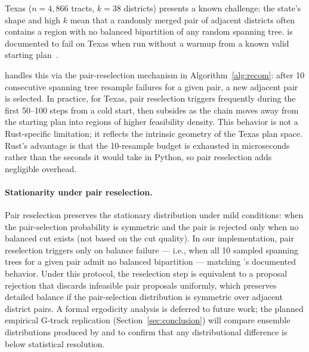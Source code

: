 Texas ($n = 4{,}866$ tracts, $k = 38$ districts) presents a known
challenge: the state's shape and high $k$ mean that a randomly merged
pair of adjacent districts often contains a region with no balanced
bipartition of any random spanning tree.
\gc{} is documented to fail on Texas when run without a warmup from a
known valid starting plan~\citep{gerrychain2021}.

\re{} handles this via the pair-reselection mechanism in
Algorithm~\ref{alg:recom}: after 10 consecutive spanning tree resample
failures for a given pair, a new adjacent pair is selected.
In practice, for Texas, pair reselection triggers frequently during the
first 50--100 steps from a cold start, then subsides as the chain moves
away from the starting plan into regions of higher feasibility density.
This behavior is not a Rust-specific limitation; it reflects the intrinsic
geometry of the Texas plan space.
Rust's advantage is that the 10-resample budget is exhausted in
microseconds rather than the seconds it would take in Python, so pair
reselection adds negligible overhead.

\paragraph{Stationarity under pair reselection.}
Pair reselection preserves the \recom{} stationary distribution under
mild conditions: when the pair-selection probability is symmetric and
the pair is rejected only when no balanced cut exists (not based on the
cut quality).
In our implementation, pair reselection triggers only on balance failure
--- i.e., when all 10 sampled spanning trees for a given pair admit no
balanced bipartition --- matching \gc{}'s documented behavior.
Under this protocol, the reselection step is equivalent to a proposal
rejection that discards infeasible pair proposals uniformly, which
preserves detailed balance if the pair-selection distribution is
symmetric over adjacent district pairs.
A formal ergodicity analysis is deferred to future work; the planned
empirical G-track replication (Section~\ref{sec:conclusion}) will compare
ensemble distributions produced by \re{} and \gc{} to confirm that any
distributional difference is below statistical resolution.
